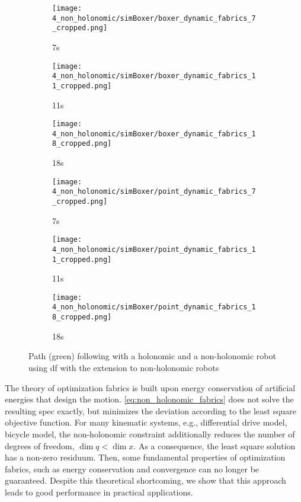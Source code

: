 \begin{figure}
  \centering
  \begin{subfigure}{0.3\linewidth}
    \centering
    \texttt{[image: 4\_non\_holonomic/simBoxer/boxer\_dynamic\_fabrics\_7\_cropped.png]}
    \caption{7s}
  \end{subfigure}%
  \begin{subfigure}{0.3\linewidth}
    \centering
    \texttt{[image: 4\_non\_holonomic/simBoxer/boxer\_dynamic\_fabrics\_11\_cropped.png]}
    \caption{11s}
  \end{subfigure}%
  \begin{subfigure}{0.3\linewidth}
    \centering
    \texttt{[image: 4\_non\_holonomic/simBoxer/boxer\_dynamic\_fabrics\_18\_cropped.png]}
    \caption{18s}
  \end{subfigure}
  \begin{subfigure}{0.3\linewidth}
    \centering
    \texttt{[image: 4\_non\_holonomic/simBoxer/point\_dynamic\_fabrics\_7\_cropped.png]}
    \caption{7s}
  \end{subfigure}%
  \begin{subfigure}{0.3\linewidth}
    \centering
    \texttt{[image: 4\_non\_holonomic/simBoxer/point\_dynamic\_fabrics\_11\_cropped.png]}
    \caption{11s}
  \end{subfigure}%
  \begin{subfigure}{0.3\linewidth}
    \centering
    \texttt{[image: 4\_non\_holonomic/simBoxer/point\_dynamic\_fabrics\_18\_cropped.png]}
    \caption{18s}
  \end{subfigure}%
  \caption{Path (green) following with a holonomic and a non\hyp{}holonomic robot using \ac{df} with the extension
  to non\hyp{}holonomic robots}
  \label{fig:non_holonomic_trajectory}
\end{figure}


The theory of optimization fabrics is built upon energy conservation of artificial energies
that design the motion. \cref{eq:non_holonomic_fabrics} does not solve the
resulting spec exactly, but minimizes the deviation according to the least square objective function.
For many kinematic systems, e.g., differential drive model, bicycle model, the
non\hyp{}holonomic constraint additionally reduces the number of degrees of freedom, 
$\dim{q} < \dim{x}$. As a consequence, the least square solution has a non-zero residuum.
Then, some fundamental properties of optimization fabrics, such as energy
conservation and convergence can no longer be guaranteed. Despite this theoretical
shortcoming, we show that this approach leads to good performance in practical applications. 









